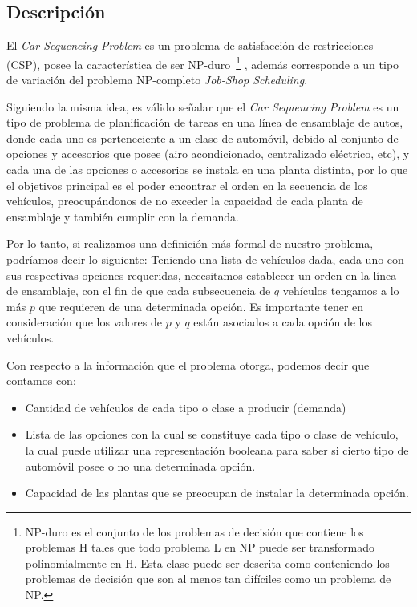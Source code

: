 \subsection{Descripción}
El \emph{Car Sequencing Problem} es un problema de satisfacción de restricciones (CSP), posee la
característica de ser NP-duro~\footnote{
NP-duro es el conjunto de los problemas de decisión que contiene los problemas H
tales que todo problema L en NP puede ser transformado polinomialmente en H.
Esta clase puede ser descrita como conteniendo los problemas de decisión que son
al menos tan difíciles como un problema de NP.}
, además corresponde a un tipo de variación del problema NP-completo \emph{Job-Shop Scheduling}.%

Siguiendo la misma idea, es válido señalar que el \emph{Car Sequencing Problem} es un tipo de problema de planificación
de tareas en una línea de ensamblaje de autos, donde cada uno es perteneciente a un clase de automóvil, debido al conjunto
de opciones y accesorios que posee (airo acondicionado, centralizado eléctrico, etc), y cada una de las opciones o
accesorios se instala en una planta distinta, por lo que el objetivos principal es el poder encontrar el orden en la
secuencia de los vehículos, preocupándonos de no exceder la capacidad de cada planta de ensamblaje y también cumplir con la demanda.

Por lo tanto, si realizamos una definición más formal de nuestro problema, podríamos decir lo siguiente:
Teniendo una lista de vehículos dada, cada uno con sus respectivas opciones requeridas,
necesitamos establecer un orden en la línea de ensamblaje, con el fin de que cada subsecuencia de $q$ vehículos
tengamos a lo más $p$ que requieren de una determinada opción. Es importante tener en consideración que los
valores de $p$ y $q$ están asociados a cada opción de los vehículos.

Con respecto a la información que el problema otorga, podemos decir que contamos con:
\begin{itemize}
    \item Cantidad de vehículos de cada tipo o clase a producir (demanda)
    \item Lista de las opciones con la cual se constituye cada tipo o clase de vehículo, la cual puede utilizar una representación
        booleana para saber si cierto tipo de automóvil posee o no una determinada opción.
    \item Capacidad de las plantas que se preocupan de instalar la determinada opción.
\end{itemize}

